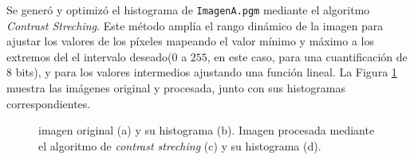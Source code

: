 \documentclass[11pt, twocolumn]{article}
\begin{document}
Se generó y optimizó el histograma de \texttt{ImagenA.pgm} mediante el algoritmo \textit{Contrast Streching}. Este método amplía el rango dinámico de la imagen para ajustar los valores de los píxeles mapeando el valor mínimo y máximo a los extremos del el intervalo deseado($0$ a $255$, en este caso, para una cuantificación de $8$ bits), y para los valores intermedios ajustando una función lineal. La Figura \ref{fig:figuras_ej_1} muestra las imágenes original y procesada, junto con sus histogramas correspondientes.



\begin{figure}[H]
  \centering
  \hfill
  \hfill
  \hfill
  \hfill
  \caption{imagen original (a) y su histograma (b). Imagen procesada mediante el algoritmo de \textit{contrast streching} (c) y su histograma (d).}
  \label{fig:figuras_ej_1}
\end{figure}
\end{document}
